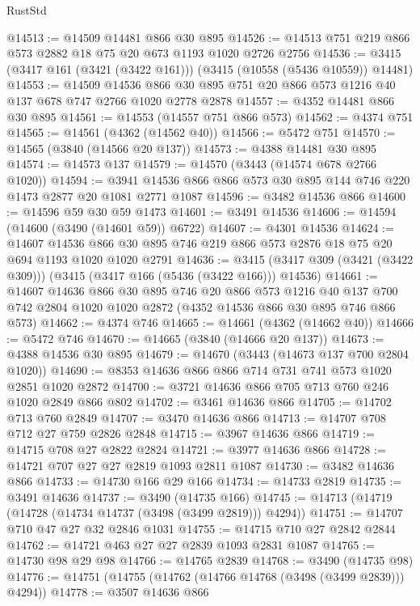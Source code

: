 \begin{lexlean}{RustStd}
\begin{coremodule}
{\begin{coremodule}
{{{{{{{{{{{{{{{{{{{{{{{{{{@14513 := @14509 @14481 @866 @30 @895
@14526 := @14513 @751 @219 @866 @573 @2882 @18 @75 @20 @673 @1193 @1020 @2726 @2756
@14536 := @3415 (@3417 @161 (@3421 (@3422 @161))) (@3415 (@10558 (@5436 @10559)) @14481)
@14553 := @14509
    @14536
    @866
    @30
    @895
    @751
    @20
    @866
    @573
    @1216
    @40
    @137
    @678
    @747
    @2766
    @1020
    @2778
    @2878
@14557 := @4352 @14481 @866 @30 @895
@14561 := @14553 (@14557 @751 @866 @573)
@14562 := @4374 @751
@14565 := @14561 (@4362 (@14562 @40))
@14566 := @5472 @751
@14570 := @14565 (@3840 (@14566 @20 @137))
@14573 := @4388 @14481 @30 @895
@14574 := @14573 @137
@14579 := @14570 (@3443 (@14574 @678 @2766 @1020))
@14594 := @3941 @14536 @866 @866 @573 @30 @895 @144 @746 @220 @1473 @2877 @20 @1081 @2771 @1087
@14596 := @3482 @14536 @866
@14600 := @14596 @59 @30 @59 @1473
@14601 := @3491 @14536
@14606 := @14594 (@14600 (@3490 (@14601 @59)) @6722)
@14607 := @4301 @14536
@14624 := @14607
    @14536
    @866
    @30
    @895
    @746
    @219
    @866
    @573
    @2876
    @18
    @75
    @20
    @694
    @1193
    @1020
    @1020
    @2791
@14636 := @3415 (@3417 @309 (@3421 (@3422 @309))) (@3415 (@3417 @166 (@5436 (@3422 @166))) @14536)
@14661 := @14607
    @14636
    @866
    @30
    @895
    @746
    @20
    @866
    @573
    @1216
    @40
    @137
    @700
    @742
    @2804
    @1020
    @1020
    @2872
    (@4352 @14536 @866 @30 @895 @746 @866 @573)
@14662 := @4374 @746
@14665 := @14661 (@4362 (@14662 @40))
@14666 := @5472 @746
@14670 := @14665 (@3840 (@14666 @20 @137))
@14673 := @4388 @14536 @30 @895
@14679 := @14670 (@3443 (@14673 @137 @700 @2804 @1020))
@14690 := @8353 @14636 @866 @866 @714 @731 @741 @573 @1020 @2851 @1020 @2872
@14700 := @3721 @14636 @866 @705 @713 @760 @246 @1020 @2849 @866 @802
@14702 := @3461 @14636 @866
@14705 := @14702 @713 @760 @2849
@14707 := @3470 @14636 @866
@14713 := @14707 @708 @712 @27 @759 @2826 @2848
@14715 := @3967 @14636 @866
@14719 := @14715 @708 @27 @2822 @2824
@14721 := @3977 @14636 @866
@14728 := @14721 @707 @27 @27 @2819 @1093 @2811 @1087
@14730 := @3482 @14636 @866
@14733 := @14730 @166 @29 @166
@14734 := @14733 @2819
@14735 := @3491 @14636
@14737 := @3490 (@14735 @166)
@14745 := @14713 (@14719 (@14728 (@14734 @14737 (@3498 (@3499 @2819))) @4294))
@14751 := @14707 @710 @47 @27 @32 @2846 @1031
@14755 := @14715 @710 @27 @2842 @2844
@14762 := @14721 @463 @27 @27 @2839 @1093 @2831 @1087
@14765 := @14730 @98 @29 @98
@14766 := @14765 @2839
@14768 := @3490 (@14735 @98)
@14776 := @14751 (@14755 (@14762 (@14766 @14768 (@3498 (@3499 @2839))) @4294))
@14778 := @3507 @14636 @866
}}}}}}}}}}}}}}}}}}}}}}}}}}
\end{coremodule}}
\end{coremodule}
\end{lexlean}
